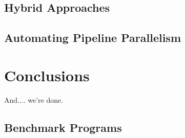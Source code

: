 \documentclass[dottedtoc, headinclude, footinclude=true, a4paper, numbers=noenddot]{scrreprt}
\begin{document}
        \section{Hybrid Approaches}
        
    
        \section{Automating Pipeline Parallelism}
    
    
    \chapter{Conclusions}
    \label{chap:conclusions}
    
        And.... we're done.


\begin{appendices}

\chapter{Benchmark Programs}


\end{appendices}

\listoftodos[Notes]

\if@openright
  \cleardoublepage
\else
  \clearpage
\fi



\end{document}

